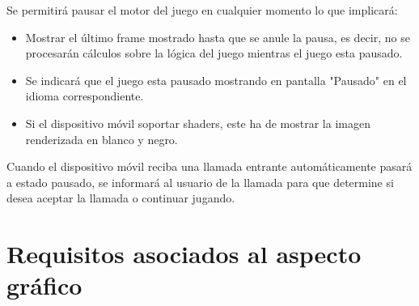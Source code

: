 \begin{description}

 {Se permitirá pausar el motor del juego en cualquier momento lo que implicará:
	\begin{itemize}
	\item Mostrar el último frame mostrado hasta que se anule la pausa, es decir, no se procesarán cálculos sobre la lógica del juego mientras el juego esta pausado.
	\item Se indicará que el juego esta pausado mostrando en pantalla "Pausado" en el idioma correspondiente. 
	\item Si el dispositivo móvil soportar shaders, este ha de mostrar la imagen renderizada en blanco y negro.
	\end{itemize}
}

 { Cuando el dispositivo móvil reciba una llamada entrante automáticamente pasará a estado pausado, se informará al usuario de la llamada para que determine si desea aceptar la llamada o continuar jugando. 
}

\end{description}


\section{Requisitos asociados al aspecto gráfico}

